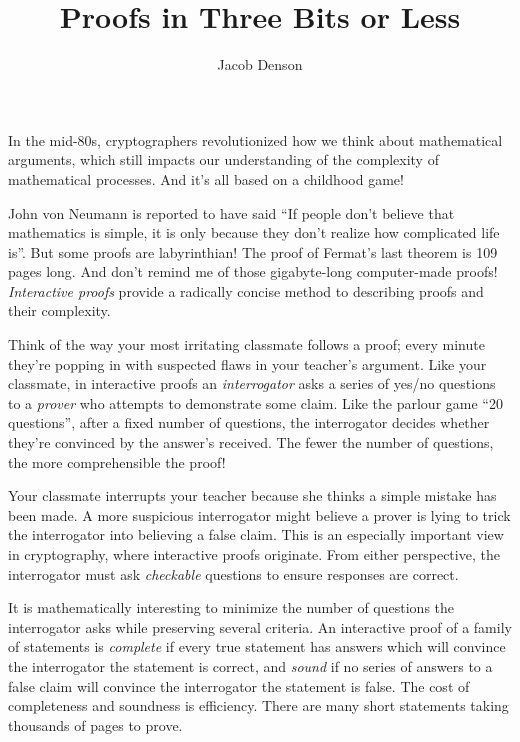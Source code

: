 \documentclass{article}
\title{Proofs in Three Bits or Less}
\author{Jacob Denson}
\theoremstyle{plain}
\theoremstyle{remark}
\theoremstyle{definition}
\begin{document}
\maketitle



{\Large In the mid-80s, cryptographers revolutionized how we think about mathematical arguments, which still impacts our understanding of the complexity of mathematical processes. And it's all based on a childhood game!}

\begin{multicols}{2}

John von Neumann is reported to have said ``If people don't believe that mathematics is simple, it is only because they don't realize how complicated life is''. But some proofs are labyrinthian! The proof of Fermat's last theorem is 109 pages long. And don’t remind me of those gigabyte-long computer-made proofs! {\it Interactive proofs} provide a radically concise method to describing proofs and their complexity.

Think of the way your most irritating classmate follows a proof; every minute they're popping in with suspected flaws in your teacher's argument. Like your classmate, in interactive proofs an {\it interrogator} asks a series of yes/no questions to a {\it prover} who attempts to demonstrate some claim. Like the parlour game ``20 questions'', after a fixed number of questions, the interrogator decides whether they're convinced by the answer's received. The fewer the number of questions, the more comprehensible the proof!

Your classmate interrupts your teacher because she thinks a simple mistake has been made. A more suspicious interrogator might believe a prover is lying to trick the interrogator into believing a false claim. This is an especially important view in cryptography, where interactive proofs originate. From either perspective, the interrogator must ask {\it checkable} questions to ensure responses are correct.

It is mathematically interesting to minimize the number of questions the interrogator asks while preserving several criteria. An interactive proof of a family of statements is {\it complete} if every true statement has answers which will convince the interrogator the statement is correct, and {\it sound} if no series of answers to a false claim will convince the interrogator the statement is false. The cost of completeness and soundness is efficiency. There are many short statements taking thousands of pages to prove.


\end{multicols}
\end{document}
